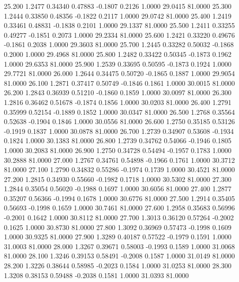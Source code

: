   25.200   1.2477   0.34340   0.47883  -0.1807   0.2126   1.0000  29.0415  81.0000
  25.300   1.2444   0.33850   0.48356  -0.1822   0.2117   1.0000  29.0742  81.0000
  25.400   1.2419   0.33461   0.48831  -0.1838   0.2101   1.0000  29.1337  81.0000
  25.500   1.2411   0.33255   0.49277  -0.1851   0.2073   1.0000  29.2334  81.0000
  25.600   1.2421   0.33220   0.49676  -0.1861   0.2038   1.0000  29.3603  81.0000
  25.700   1.2445   0.33282   0.50032  -0.1868   0.2000   1.0000  29.4968  81.0000
  25.800   1.2482   0.33422   0.50345  -0.1873   0.1962   1.0000  29.6353  81.0000
  25.900   1.2539   0.33695   0.50595  -0.1873   0.1924   1.0000  29.7721  81.0000
  26.000   1.2644   0.34475   0.50720  -0.1865   0.1887   1.0000  29.9054  81.0000
  26.100   1.2871   0.37417   0.50749  -0.1846   0.1861   1.0000  30.0015  81.0000
  26.200   1.2843   0.36939   0.51210  -0.1860   0.1859   1.0000  30.0097  81.0000
  26.300   1.2816   0.36462   0.51678  -0.1874   0.1856   1.0000  30.0203  81.0000
  26.400   1.2791   0.35999   0.52154  -0.1889   0.1852   1.0000  30.0347  81.0000
  26.500   1.2768   0.35564   0.52638  -0.1904   0.1846   1.0000  30.0556  81.0000
  26.600   1.2750   0.35185   0.53126  -0.1919   0.1837   1.0000  30.0878  81.0000
  26.700   1.2739   0.34907   0.53608  -0.1934   0.1824   1.0000  30.1383  81.0000
  26.800   1.2739   0.34762   0.54066  -0.1946   0.1805   1.0000  30.2083  81.0000
  26.900   1.2750   0.34728   0.54494  -0.1957   0.1783   1.0000  30.2888  81.0000
  27.000   1.2767   0.34761   0.54898  -0.1966   0.1761   1.0000  30.3712  81.0000
  27.100   1.2790   0.34832   0.55286  -0.1974   0.1739   1.0000  30.4521  81.0000
  27.200   1.2815   0.34930   0.55660  -0.1982   0.1718   1.0000  30.5302  81.0000
  27.300   1.2844   0.35054   0.56020  -0.1988   0.1697   1.0000  30.6056  81.0000
  27.400   1.2877   0.35207   0.56366  -0.1994   0.1678   1.0000  30.6776  81.0000
  27.500   1.2914   0.35405   0.56693  -0.1998   0.1659   1.0000  30.7461  81.0000
  27.600   1.2958   0.35683   0.56996  -0.2001   0.1642   1.0000  30.8112  81.0000
  27.700   1.3013   0.36120   0.57264  -0.2002   0.1625   1.0000  30.8730  81.0000
  27.800   1.3092   0.36969   0.57473  -0.1998   0.1609   1.0000  30.9325  81.0000
  27.900   1.3289   0.40187   0.57522  -0.1979   0.1591   1.0000  31.0003  81.0000
  28.000   1.3267   0.39671   0.58003  -0.1993   0.1589   1.0000  31.0068  81.0000
  28.100   1.3246   0.39153   0.58491  -0.2008   0.1587   1.0000  31.0149  81.0000
  28.200   1.3226   0.38644   0.58985  -0.2023   0.1584   1.0000  31.0253  81.0000
  28.300   1.3208   0.38153   0.59488  -0.2038   0.1581   1.0000  31.0393  81.0000
